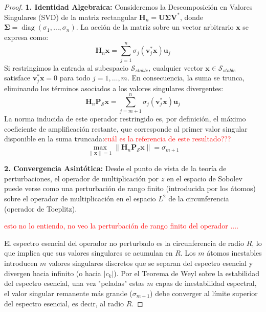 \documentclass[12pt,a4paper]{article}
\begin{document}
\begin{proof}
\textbf{1. Identidad Algebraica:}
Consideremos la Descomposición en Valores Singulares (SVD) de la matriz rectangular $\mathbf{H}_n = \mathbf{U} \mathbf{\Sigma} \mathbf{V}^*$, donde $\mathbf{\Sigma} = \operatorname{diag}(\sigma_1, \dots, \sigma_n)$.
La acción de la matriz sobre un vector arbitrario $\mathbf{x}$ se expresa como:
$$ \mathbf{H}_n \mathbf{x} = \sum_{j=1}^n \sigma_j (\mathbf{v}_j^* \mathbf{x}) \mathbf{u}_j $$
Si restringimos la entrada al subespacio $\mathcal{S}_{stable}$, cualquier vector $\mathbf{x} \in \mathcal{S}_{stable}$ satisface $\mathbf{v}_j^* \mathbf{x} = 0$ para todo $j=1, \dots, m$.
En consecuencia, la suma se trunca, eliminando los términos asociados a los valores singulares divergentes:
$$ \mathbf{H}_n \mathbf{P}_{\mathcal{S}} \mathbf{x} = \sum_{j=m+1}^n \sigma_j (\mathbf{v}_j^* \mathbf{x}) \mathbf{u}_j $$
La norma inducida de este operador restringido es, por definición, el máximo coeficiente de amplificación restante, que corresponde al primer valor singular disponible en la suma truncada:\textcolor{red}{cuál es la referencia de este resultado???}
$$ \max_{\|\mathbf{x}\|=1} \|\mathbf{H}_n \mathbf{P}_{\mathcal{S}} \mathbf{x}\| = \sigma_{m+1} $$

\textbf{2. Convergencia Asintótica:}
Desde el punto de vista de la teoría de perturbaciones, el operador de multiplicación por $z$ en el espacio de Sobolev puede verse como una perturbación de rango finito (introducida por los átomos) sobre el operador de multiplicación en el espacio $L^2$ de la circunferencia (operador de Toeplitz).

\textcolor{red}{esto no lo entiendo, no veo la perturbación de rango finito del operador ....}

El espectro esencial del operador no perturbado es la circunferencia de radio $R$, lo que implica que sus valores singulares se acumulan en $R$.
Los $m$ átomos inestables introducen $m$ valores singulares discretos que se separan del espectro esencial y divergen hacia infinito (o hacia $|c_k|$).
Por el Teorema de Weyl sobre la estabilidad del espectro esencial, una vez "peladas" estas $m$ capas de inestabilidad espectral, el valor singular remanente más grande ($\sigma_{m+1}$) debe converger al límite superior del espectro esencial, es decir, al radio $R$.
\end{proof}
\end{document}
